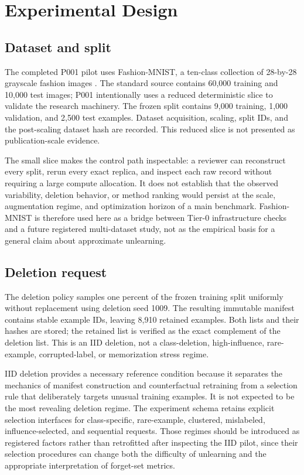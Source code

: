 \section{Experimental Design}
\subsection{Dataset and split}
The completed P001 pilot uses Fashion-MNIST, a ten-class collection of 28-by-28 grayscale
fashion images \cite{xiao2017fashion}. The standard source contains 60,000 training and
10,000 test images; P001 intentionally uses a reduced deterministic slice to validate the
research machinery. The frozen split contains 9,000 training, 1,000 validation, and 2,500
test examples. Dataset acquisition, scaling, split IDs, and the post-scaling dataset hash
are recorded. This reduced slice is not presented as publication-scale evidence.

The small slice makes the control path inspectable: a reviewer can reconstruct every split,
rerun every exact replica, and inspect each raw record without requiring a large compute
allocation. It does not establish that the observed variability, deletion behavior, or
method ranking would persist at the scale, augmentation regime, and optimization horizon of
a main benchmark. Fashion-MNIST is therefore used here as a bridge between Tier-0
infrastructure checks and a future registered multi-dataset study, not as the empirical
basis for a general claim about approximate unlearning.

\subsection{Deletion request}
The deletion policy samples one percent of the frozen training split uniformly without
replacement using deletion seed 1009. The resulting immutable manifest contains
\PilotForgetCount{} stable example IDs, leaving 8,910 retained examples. Both lists and
their hashes are stored; the retained list is verified as the exact complement of the
deletion list. This is an IID deletion, not a class-deletion, high-influence, rare-example,
corrupted-label, or memorization stress regime.

IID deletion provides a necessary reference condition because it separates the mechanics of
manifest construction and counterfactual retraining from a selection rule that deliberately
targets unusual training examples. It is not expected to be the most revealing deletion
regime. The experiment schema retains explicit selection interfaces for class-specific,
rare-example, clustered, mislabeled, influence-selected, and sequential requests. Those
regimes should be introduced as registered factors rather than retrofitted after inspecting
the IID pilot, since their selection procedures can change both the difficulty of unlearning
and the appropriate interpretation of forget-set metrics.

